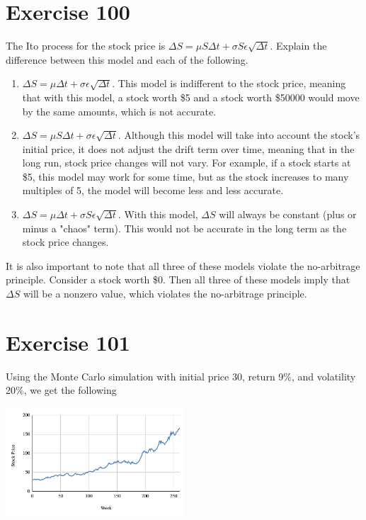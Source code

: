 \documentclass{article}
\begin{document}
\section*{Exercise 100}
\begin{flushleft}
    The Ito process for the stock price is $\Delta S = \mu S \Delta t + \sigma S \epsilon \sqrt{\Delta t}$. Explain the difference between this model and each of the following.
    \begin{enumerate}
        \item $\Delta S = \mu \Delta t + \sigma \epsilon \sqrt{\Delta t}$. This model is indifferent to the stock price, meaning that with this model, a stock worth \$5 and a stock worth \$50000 would move by the same amounts, which is not accurate.
        \item $\Delta S = \mu S \Delta t + \sigma \epsilon \sqrt{\Delta t}$. Although this model will take into account the stock's initial price, it does not adjust the drift term over time, meaning that in the long run, stock price changes will not vary. For example, if a stock starts at \$5, this model may work for some time, but as the stock increases to many multiples of 5, the model will become less and less accurate.
        \item $\Delta S = \mu \Delta t + \sigma S \epsilon \sqrt{\Delta t}$. With this model, $\Delta S$ will always be constant (plus or minus a "chaos" term). This would not be accurate in the long term as the stock price changes.
    \end{enumerate}
    It is also important to note that all three of these models violate the no-arbitrage principle. Consider a stock worth \$0. Then all three of these models imply that $\Delta S$ will be a nonzero value, which violates the no-arbitrage principle.
\end{flushleft}

\section*{Exercise 101}
Using the Monte Carlo simulation with initial price 30, return 9\%, and volatility 20\%, we get the following
\begin{center}
    \includegraphics[width=0.5\textwidth]{figures/ex101.png}
\end{center}
\end{document}
